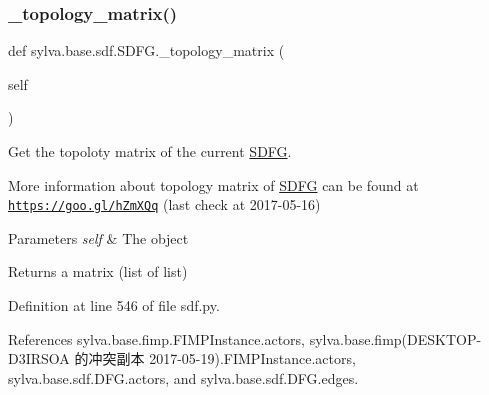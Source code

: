 \mbox{\label{classsylva_1_1base_1_1sdf_1_1_s_d_f_g_a1bb270c5d255df4a78bd81650fdc80a7}} 
\subsubsection{\texorpdfstring{\+\_\+topology\+\_\+matrix()}{\_topology\_matrix()}}
{\footnotesize\ttfamily def sylva.\+base.\+sdf.\+S\+D\+F\+G.\+\_\+topology\+\_\+matrix (\begin{DoxyParamCaption}\item[{}]{self }\end{DoxyParamCaption})\hspace{0.3cm}{\ttfamily [private]}}



Get the topoloty matrix of the current \hyperlink{classsylva_1_1base_1_1sdf_1_1_s_d_f_g}{S\+D\+FG}. 

More information about topology matrix of \hyperlink{classsylva_1_1base_1_1sdf_1_1_s_d_f_g}{S\+D\+FG} can be found at \href{https://goo.gl/hZmXQq}{\tt https\+://goo.\+gl/h\+Zm\+X\+Qq} (last check at 2017-\/05-\/16)


\begin{DoxyParams}{Parameters}
{\em self} & The object\\
\hline
\end{DoxyParams}
\begin{DoxyReturn}{Returns}
a matrix (list of list) 
\end{DoxyReturn}


Definition at line 546 of file sdf.\+py.



References sylva.\+base.\+fimp.\+F\+I\+M\+P\+Instance.\+actors, sylva.\+base.\+fimp(\+D\+E\+S\+K\+T\+O\+P-\/\+D3\+I\+R\+S\+O\+A 的冲突副本 2017-\/05-\/19).\+F\+I\+M\+P\+Instance.\+actors, sylva.\+base.\+sdf.\+D\+F\+G.\+actors, and sylva.\+base.\+sdf.\+D\+F\+G.\+edges.


